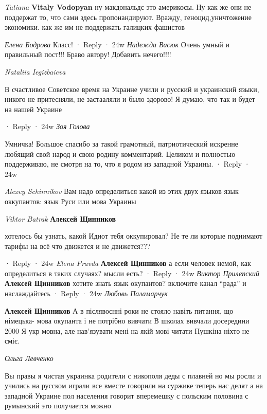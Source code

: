 \begin{itemize}
\begin{itemize}
\emph{Tatiana}
\textbf{Vitaly Vodopyan} ну макдональдс это америкосы. Ну как же они не
поддержат то, что сами здесь пропонандируют. Вражду, геноцид,уничтожение
экономики. как же им не поддержать галицких фашистов
\end{itemize}

\emph{Елена Бодрова}
Класс!
 · Reply · 24w
\emph{Надежда Васюк}
Очень умный и правильный пост!!! Браво автору! Добавить нечего!!!!

\emph{Nataliia Iegizbaieva}

В счастливое Советское время на Украине учили и русский и украинский языки,
никого не притесняли, не застааляли и было здорово! Я думаю, что так и будет
на нашей Украине

 · Reply · 24w
\emph{Зоя Голова}

Умничка! Большое спасибо за такой грамотный, патриотический искренне любящий
свой народ и свою родину комментарий. Целиком и полностью поддерживаю, не
смотря на то, что я родом из западной Украины.
 · Reply · 24w

\emph{Alexey Schinnikov}
Вам надо определиться какой из этих двух языков язык оккупантов: язык Руси или
мова Украины

\begin{itemize}
\emph{Viktor Batrak}
\textbf{Алексей Щинников} 

хотелось бы узнать, какой Идиот тебя оккупировал? Не те ли которые поднимают
тарифы на всё что движется и не движется???

 · Reply · 24w
\emph{Elena Pravda}
\textbf{Алексей Щинников} а если человек немой, как определиться в таких случаях? мысли есть?
 · Reply · 24w
\emph{Виктор Прилепский}
\textbf{Алексей Щинников} хотите знать язык окупантов? включите канал \enquote{рада} и наслаждайтесь
 · Reply · 24w
\emph{Любовь Паламарчук}

\textbf{Алексей Щинников} А в післявоєнні роки не стояло навіть питання, що німецька-
мова окупанта і не потрібно вивчати В школах вивчали досередини 2000 Я укр
мовна, але нав'язувати мені на якій мові читати Пушкіна ніхто не сміє.

\end{itemize}

\emph{Ольга Левченко}

Вы правы я чистая украинка родители с никополя деды с плавней но мы росли и
учились на русском играли все вместе говорили на суржике теперь нас делят а на
западной Украине пол населения говорит вперемешку с польским половина с
румынский это получается можно


\end{itemize}
